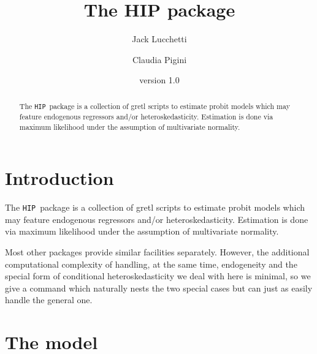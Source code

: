 \documentclass[a4paper,10pt]{article}
\title{The HIP package}
\author{Jack Lucchetti \and Claudia Pigini}
\date{version 1.0}
\newcommand{\app}[1]{\textsf{#1}}
\newcounter{script}[section]
\newcommand{\HIP}{\texttt{HIP}}
\begin{document}
\maketitle

\begin{abstract}
The \HIP\ package is a collection of \app{gretl} scripts to estimate
probit models which may feature endogenous regressors and/or
heteroskedasticity. Estimation is done via maximum likelihood under
the assumption of multivariate normality.
\end{abstract}

\tableofcontents

\section{Introduction}
The \HIP\ package is a collection of \app{gretl} scripts to estimate
probit models which may feature endogenous regressors and/or
heteroskedasticity. Estimation is done via maximum likelihood under
the assumption of multivariate normality.

Most other packages provide similar facilities separately. However,
the additional computational complexity of handling, at the same time,
endogeneity and the special form of conditional heteroskedasticity we
deal with here is minimal, so we give a command which naturally nests
the two special cases but can just as easily handle the general one.

\section{The model}
\label{sec:model}
\end{document}
